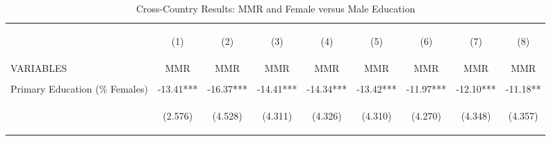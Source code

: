 \begin{landscape}\begin{table}[htpb!]\begin{center}\caption{Cross-Country Results: MMR and Female versus Male Education}\label{MMRtab:MMRgender}\begin{tabular}{lcccccccc}\toprule&\begin{footnotesize}(1)\end{footnotesize}&\begin{footnotesize}(2)\end{footnotesize}&\begin{footnotesize}(3)\end{footnotesize}&\begin{footnotesize}(4)\end{footnotesize}&\begin{footnotesize}(5)\end{footnotesize}&\begin{footnotesize}(6)\end{footnotesize}&\begin{footnotesize}(7)\end{footnotesize}&\begin{footnotesize}(8) \end{footnotesize}\\
VARIABLES&MMR&MMR&MMR&MMR&MMR&MMR&MMR&MMR\\ \midrule
&&&&&&&&\\
Primary Education (\% Females) &-13.41***&-16.37***&-14.41***&-14.34***&-13.42***&-11.97***&-12.10***&-11.18**\\
&\begin{footnotesize}(2.576)\end{footnotesize}&\begin{footnotesize}(4.528)\end{footnotesize}&\begin{footnotesize}(4.311)\end{footnotesize}&\begin{footnotesize}(4.326)\end{footnotesize}&\begin{footnotesize}(4.310)\end{footnotesize}&\begin{footnotesize}(4.270)\end{footnotesize}&\begin{footnotesize}(4.348)\end{footnotesize}&\begin{footnotesize}(4.357)\end{footnotesize}\\

\end{tabular}
\end{center}
\end{table}
\end{landscape}
